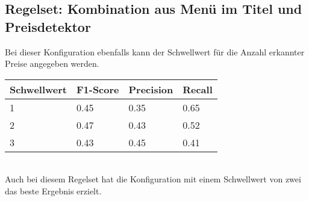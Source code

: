 \subsection{Regelset: Kombination aus Menü im Titel und Preisdetektor}
Bei dieser Konfiguration ebenfalls kann der Schwellwert für die Anzahl erkannter Preise angegeben werden.\\
\begin{tabular}{|l|l|l|l|}
	\hline
	Schwellwert & F1-Score & Precision & Recall\\
	\hline
	1 & 0.45 & 0.35 & 0.65 \\
	2 & 0.47 & 0.43 & 0.52 \\
	3 & 0.43 & 0.45 & 0.41 \\
	\hline
\end{tabular}\\
Auch bei diesem Regelset hat die Konfiguration mit einem Schwellwert von zwei das beste Ergebnis erzielt.
